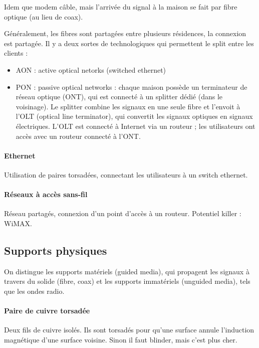 Idem que modem câble, mais l'arrivée du signal à la maison se fait par fibre optique (au lieu de coax).


Généralement, les fibres sont partagées entre plusieurs résidences, la connexion est partagée. Il y a deux sortes de technologiques qui permettent le split entre les clients :

\begin{itemize}
	\item AON : active optical netorks (switched ethernet)
	\item PON : passive optical networks : chaque maison possède un terminateur de réseau optique (ONT), qui est connecté à un splitter dédié (dans le voisinage). Le splitter combine les signaux en une seule fibre et l'envoit à l'OLT (optical line terminator), qui convertit les signaux optiques en signaux électriques. L'OLT est connecté à Internet via un routeur ; les utilisateurs ont accès avec un routeur connecté à l'ONT.
\end{itemize}

\paragraph{Ethernet}

Utilisation de paires torsadées, connectant les utilisateurs à un switch ethernet.


\paragraph{Réseaux à accès sans-fil}

Réseau partagés, connexion d'un point d'accès à un routeur. Potentiel killer : WiMAX.

\subsection{Supports physiques}

On distingue les supports matériels (guided media), qui propagent les signaux à travers du solide (fibre, coax) et les supports immatériels (unguided media), tels que les ondes radio.


	\paragraph{Paire de cuivre torsadée} Deux fils de cuivre isolés. Ils sont torsadés pour qu'une surface annule l'induction magnétique d'une surface voisine. Sinon il faut blinder, mais c'est plus cher.
	
